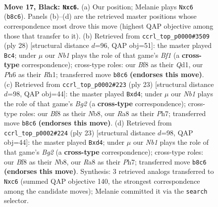 \documentclass[11pt]{article}
\begin{document}
\clearpage

\begin{figure}[p]\centering
\begin{subfigure}{0.46\textwidth}\centering
\resizebox{\linewidth}{!}{%
\newchessgame
\chessboard[
  setfen={rnq2b1r/p3kpp1/2P2n1p/5p1P/B2P1P2/8/6P1/R1BQK1NR b KQ - 0 17},
  showmover=false,
  pgfstyle=straightmove, color=movearrow, markmove={b8-c6}
]}
\caption{}
\end{subfigure}\hfill
\begin{subfigure}{0.46\textwidth}\centering
\resizebox{\linewidth}{!}{%
\newchessgame
\chessboard[
  setfen={r1bq1r1k/5ppp/p1np4/3Np1b1/R3P3/2P5/1PN2PPP/3QKB1R w K - 1 15},
  showmover=false,
  pgfstyle=straightmove, color=movearrow, markmove={f1-c4}
]}
\caption{}
\end{subfigure}
\\[4pt]
\begin{subfigure}{0.46\textwidth}\centering
\resizebox{\linewidth}{!}{%
\newchessgame
\chessboard[
  setfen={rn1qk2r/pp2ppbp/6p1/8/3PP3/5B2/P4PPP/1RBQK2R b Kkq - 0 12},
  showmover=false,
  pgfstyle=straightmove, color=movearrow, markmove={g7-d4}
]}
\caption{}
\end{subfigure}\hfill
\begin{subfigure}{0.46\textwidth}\centering
\resizebox{\linewidth}{!}{%
\newchessgame
\chessboard[
  setfen={rn1qk2r/pp2ppbp/6p1/8/3PP3/5B2/P4PPP/1RBQK2R b Kkq - 0 12},
  showmover=false,
  pgfstyle=straightmove, color=movearrow, markmove={g7-d4}
]}
\caption{}
\end{subfigure}
\caption{\textbf{Move 17, Black: \texttt{Nxc6}.} (a) Our position; Melanie plays \texttt{Nxc6} (\texttt{b8c6}). Panels (b)--(d) are the retrieved master positions whose correspondence most drove this move (highest QAP objective among those that transfer to it). (b) Retrieved from \texttt{ccrl\_top\_p0000\#3509} (ply 28) [structural distance $d$=96, QAP obj=51]: the master played \texttt{Bc4}; under $\mu$ our \emph{Nb1} plays the role of that game's \emph{Bf1} (a \textbf{cross-type} correspondence); cross-type roles: our \emph{B}f8 as their \emph{Q}d1, our \emph{P}h6 as their \emph{R}h1; transferred move \texttt{b8c6} \textbf{(endorses this move)}. (c) Retrieved from \texttt{ccrl\_top\_p0002\#223} (ply 23) [structural distance $d$=98, QAP obj=44]: the master played \texttt{Bxd4}; under $\mu$ our \emph{Nb1} plays the role of that game's \emph{Bg2} (a \textbf{cross-type} correspondence); cross-type roles: our \emph{B}f8 as their \emph{N}b8, our \emph{R}a8 as their \emph{P}h7; transferred move \texttt{b8c6} \textbf{(endorses this move)}. (d) Retrieved from \texttt{ccrl\_top\_p0002\#224} (ply 23) [structural distance $d$=98, QAP obj=44]: the master played \texttt{Bxd4}; under $\mu$ our \emph{Nb1} plays the role of that game's \emph{Bg2} (a \textbf{cross-type} correspondence); cross-type roles: our \emph{B}f8 as their \emph{N}b8, our \emph{R}a8 as their \emph{P}h7; transferred move \texttt{b8c6} \textbf{(endorses this move)}. Synthesis: 3 retrieved analogs transferred to \texttt{Nxc6} (summed QAP objective 140, the strongest correspondence among the candidate moves); Melanie committed it via the \texttt{search} selector.}
\label{fig:thought-m33}
\end{figure}
\end{document}

